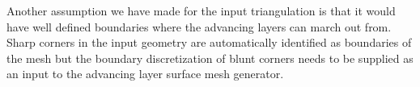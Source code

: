 Another assumption we have made for the input triangulation is that it would have well defined boundaries where the advancing layers can march out from. Sharp corners in the input geometry are automatically identified as boundaries of the mesh but the boundary discretization of blunt corners needs to be supplied as an input to the advancing layer surface mesh generator.








































